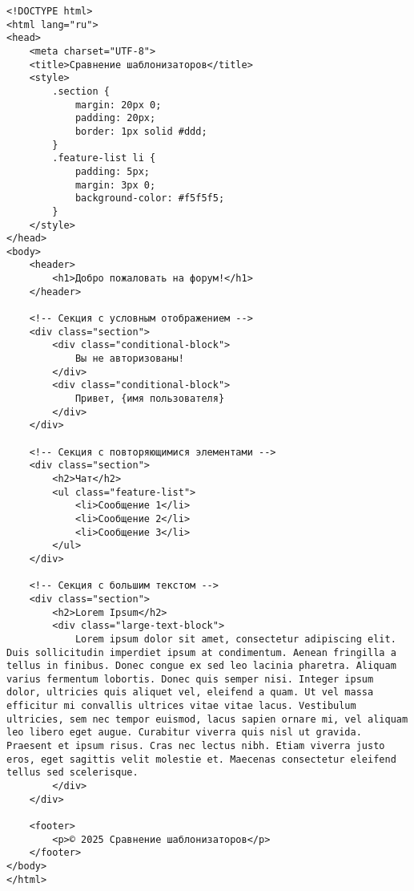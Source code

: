 \begin{lstlisting}
<!DOCTYPE html>
<html lang="ru">
<head>
    <meta charset="UTF-8">
    <title>Сравнение шаблонизаторов</title>
    <style>
        .section {
            margin: 20px 0;
            padding: 20px;
            border: 1px solid #ddd;
        }
        .feature-list li {
            padding: 5px;
            margin: 3px 0;
            background-color: #f5f5f5;
        }
    </style>
</head>
<body>
    <header>
        <h1>Добро пожаловать на форум!</h1>
    </header>

    <!-- Секция с условным отображением -->
    <div class="section">
        <div class="conditional-block">
            Вы не авторизованы!
        </div>
        <div class="conditional-block">
            Привет, {имя пользователя}
        </div>
    </div>

    <!-- Секция с повторяющимися элементами -->
    <div class="section">
        <h2>Чат</h2>
        <ul class="feature-list">
            <li>Сообщение 1</li>
            <li>Сообщение 2</li>
            <li>Сообщение 3</li>
        </ul>
    </div>

    <!-- Секция с большим текстом -->
    <div class="section">
        <h2>Lorem Ipsum</h2>
        <div class="large-text-block">
            Lorem ipsum dolor sit amet, consectetur adipiscing elit. Duis sollicitudin imperdiet ipsum at condimentum. Aenean fringilla a tellus in finibus. Donec congue ex sed leo lacinia pharetra. Aliquam varius fermentum lobortis. Donec quis semper nisi. Integer ipsum dolor, ultricies quis aliquet vel, eleifend a quam. Ut vel massa efficitur mi convallis ultrices vitae vitae lacus. Vestibulum ultricies, sem nec tempor euismod, lacus sapien ornare mi, vel aliquam leo libero eget augue. Curabitur viverra quis nisl ut gravida. Praesent et ipsum risus. Cras nec lectus nibh. Etiam viverra justo eros, eget sagittis velit molestie et. Maecenas consectetur eleifend tellus sed scelerisque.
        </div>
    </div>

    <footer>
        <p>© 2025 Сравнение шаблонизаторов</p>
    </footer>
</body>
</html>

\end{lstlisting}
